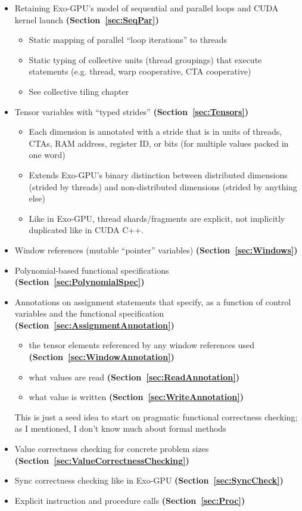 \begin{itemize}
  \item Retaining Exo-GPU's model of sequential and parallel loops and CUDA kernel launch \textbf{(Section~\ref{sec:SeqPar})}
  \begin{itemize}
    \item Static mapping of parallel ``loop iterations'' to threads
    \item Static typing of collective units (thread groupings) that execute statements (e.g. thread, warp cooperative, CTA cooperative)
    \item See  collective tiling chapter
  \end{itemize}
  \item Tensor variables with ``typed strides'' \textbf{(Section~\ref{sec:Tensors})}
  \begin{itemize}
    \item Each dimension is annotated with a stride that is in units of threads, CTAs, RAM address, register ID, or bits (for multiple values packed in one word)
    \item Extends Exo-GPU's binary distinction between distributed dimensions (strided by threads) and non-distributed dimensions (strided by anything else)
    \item Like in Exo-GPU, thread shards/fragments are explicit, not implicitly duplicated like in CUDA C++.
  \end{itemize}
  \item Window references (mutable ``pointer'' variables) \textbf{(Section~\ref{sec:Windows})}
  \item Polynomial-based functional specifications \textbf{(Section~\ref{sec:PolynomialSpec})}
  \item Annotations on assignment statements that specify, as a function of control variables and the functional specification \textbf{(Section~\ref{sec:AssignmentAnnotation})}
  \begin{itemize}
    \item the tensor elements referenced by any window references used \textbf{(Section~\ref{sec:WindowAnnotation})}
    \item what values are read \textbf{(Section~\ref{sec:ReadAnnotation})}
    \item what value is written \textbf{(Section~\ref{sec:WriteAnnotation})}
  \end{itemize}
  This is just a seed idea to start on pragmatic functional correctness checking; as I mentioned, I don't know much about formal methods
  \item Value correctness checking for concrete problem sizes \textbf{(Section~\ref{sec:ValueCorrectnessChecking})}
  \item Sync correctness checking like in Exo-GPU \textbf{(Section~\ref{sec:SyncCheck})}
  \item Explicit instruction and procedure calls \textbf{(Section~\ref{sec:Proc})}
\end{itemize}
